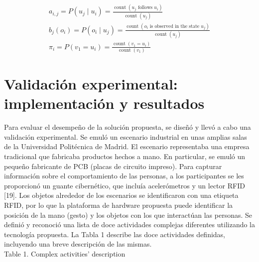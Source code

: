 \documentclass[10pt]{article}
\begin{document}
$$
\begin{gathered}
a_{i, j}=P\left(u_{j} \mid u_{i}\right)=\frac{\operatorname{count}\left(u_{j} \text { follows } u_{i}\right)}{\operatorname{count}\left(u_{j}\right)} \\
b_{j}\left(o_{i}\right)=P\left(o_{i} \mid u_{j}\right)=\frac{\operatorname{count}\left(o_{i} \text { is observed in the state } u_{j}\right)}{\operatorname{count}\left(u_{j}\right)} \\
\pi_{i}=P\left(v_{1}=u_{i}\right)=\frac{\operatorname{count}\left(v_{1}=u_{i}\right)}{\operatorname{count}\left(v_{1}\right)}
\end{gathered}
$$

\section{Validación experimental: implementación y resultados}
Para evaluar el desempeño de la solución propuesta, se diseñó y llevó a cabo una validación experimental. Se emuló un escenario industrial en unas amplias salas de la Universidad Politécnica de Madrid. El escenario representaba una empresa tradicional que fabricaba productos hechos a mano. En particular, se emuló un pequeño fabricante de PCB (placas de circuito impreso). Para capturar información sobre el comportamiento de las personas, a los participantes se les proporcionó un guante cibernético, que incluía acelerómetros y un lector RFID [19]. Los objetos alrededor de los escenarios se identificaron con una etiqueta RFID, por lo que la plataforma de hardware propuesta puede identificar la posición de la mano (gesto) y los objetos con los que interactúan las personas. Se definió y reconoció una lista de doce actividades complejas diferentes utilizando la tecnología propuesta. La Tabla 1 describe las doce actividades definidas, incluyendo una breve descripción de las mismas.\\

Table 1. Complex activities' description\\
\end{document}
